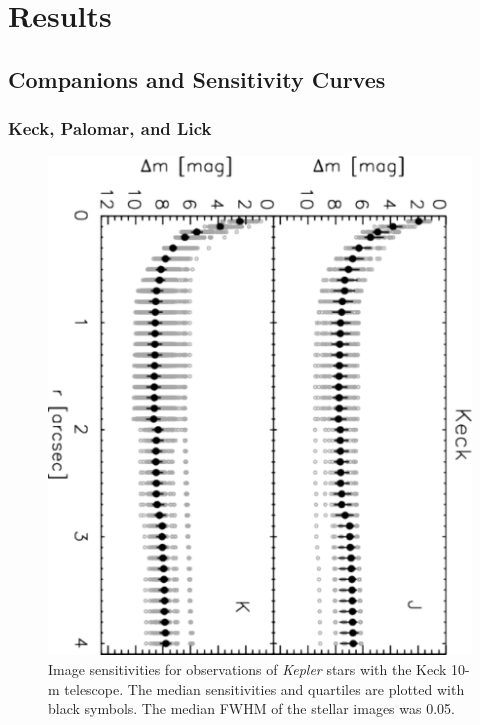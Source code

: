 \documentclass[twocolumn,appendixfloats]{aastex6}
\begin{document}
\newpage

\section{Results}
\label{res}

\subsection{Companions and Sensitivity Curves}

\subsubsection{Keck, Palomar, and Lick}

\begin{figure}[!t]
\centering
\includegraphics[angle=90, scale=0.47]{Keck_AO_images_sensitivities.pdf}
\caption{Image sensitivities for observations of {\it Kepler} stars with the 
Keck 10-m telescope. The median sensitivities and quartiles are plotted 
with black symbols. The median FWHM of the stellar images was 
0.05\arcsec.
\label{sensitivites_Keck}}
\end{figure}
\end{document}

